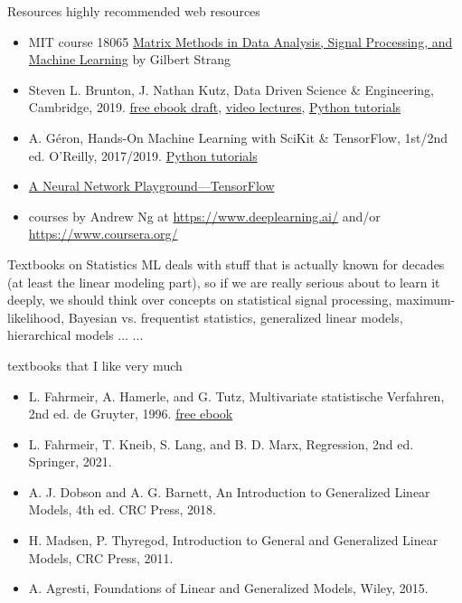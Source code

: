\documentclass[mathserif, aspectratio=43]{intbeamer}
\begin{document}
\begin{frame}{Resources}
  highly recommended web resources
  \begin{itemize}
    \item MIT course 18065 \href{https://ocw.mit.edu/courses/18-065-matrix-methods-in-data-analysis-signal-processing-and-machine-learning-spring-2018/}{Matrix Methods in Data Analysis, Signal Processing, and Machine Learning} by Gilbert Strang
    \item Steven L. Brunton, J. Nathan Kutz, Data Driven Science \& Engineering, Cambridge, 2019.
    \href{http://www.databookuw.com/databook.pdf}{free ebook draft},
    \href{http://www.databookuw.com/}{video lectures},
    \href{https://github.com/dylewsky/Data_Driven_Science_Python_Demos}{Python tutorials}
    \item A. G\'{e}ron, Hands-On Machine Learning with SciKit \& TensorFlow, 1st/2nd ed. O'Reilly, 2017/2019.
    \href{https://github.com/ageron/handson-ml2}{Python tutorials}
    \item \href{https://playground.tensorflow.org}{A Neural Network Playground---TensorFlow}
    \item courses by Andrew Ng at \url{https://www.deeplearning.ai/} and/or \url{https://www.coursera.org/}
  \end{itemize}
\end{frame}

\begin{frame}{Textbooks on Statistics}
    ML deals with stuff that is actually known for decades (at least the linear modeling part), so if we are really
    serious about to learn it deeply, we should think over concepts on
    statistical signal processing, maximum-likelihood, Bayesian vs. frequentist
    statistics, generalized linear models, hierarchical models ... ...

    textbooks that I like very much
  \begin{itemize}
  \item L. Fahrmeir, A. Hamerle, and G. Tutz, Multivariate statistische Verfahren, 2nd ed. de Gruyter, 1996.
  \href{https://www.degruyter.com/document/doi/10.1515/9783110816020/html}{free ebook}
  \item L. Fahrmeir, T. Kneib, S. Lang, and B. D. Marx, Regression, 2nd ed. Springer, 2021.
  \item A. J. Dobson and A. G. Barnett, An Introduction to Generalized Linear Models, 4th ed. CRC Press, 2018.
  \item H. Madsen, P. Thyregod, Introduction to General and Generalized Linear Models, CRC Press, 2011.
  \item A. Agresti, Foundations of Linear and Generalized Models, Wiley, 2015.
  \end{itemize}
\end{frame}
\end{document}
